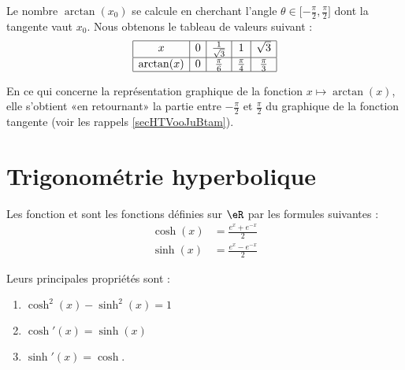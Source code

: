 Le nombre \( \arctan(x_0)\) se calcule en cherchant l'angle \( \theta\in\mathopen[ -\frac{ \pi }{2} , \frac{ \pi }{2} \mathclose]\) dont la tangente vaut \( x_0\). Nous obtenons le tableau de valeurs suivant :
\begin{equation*}
    \begin{array}[]{|c|c|c|c|c|}
        \hline
        x&0&\frac{1}{ \sqrt{3} }&1&\sqrt{3}\\
        \hline
        \arctan(x)&0&\frac{ \pi }{ 6 }&\frac{ \pi }{ 4 }&\frac{ \pi }{ 3 }\\
        \hline
    \end{array}
\end{equation*}

En ce qui concerne la représentation graphique de la fonction \( x\mapsto\arctan(x)\), elle s'obtient «en retournant» la partie entre \( -\frac{ \pi }{2}\) et \( \frac{ \pi }{ 2 }\) du graphique de la fonction tangente (voir les rappels \ref{secHTVooJuBtam}).
\begin{center}
   
\end{center}

\section{Trigonométrie hyperbolique}

\begin{definition}
    Les fonction  et  sont les fonctions définies sur $\eR$ par les formules suivantes :
    \begin{subequations}
        \begin{align}
            \cosh(x)&=\frac{  e^{x}+ e^{-x} }{2}\\
            \sinh(x)&=\frac{  e^{x}- e^{-x} }{2}
        \end{align}
    \end{subequations}
\end{definition}

Leurs principales propriétés sont :
\begin{enumerate}
    \item
        \( \cosh^2(x)-\sinh^2(x)=1\)
    \item
        \( \cosh'(x)=\sinh(x)\) 
    \item
        \( \sinh'(x)=\cosh\).
\end{enumerate}

